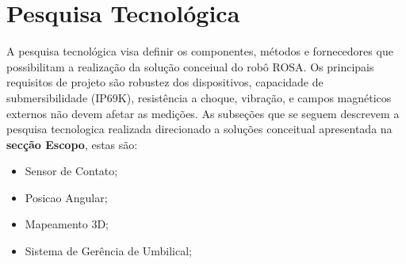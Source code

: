 

\setcounter{secnumdepth}{3}
\section{Pesquisa Tecnológica}
\label{pesqtec}


A pesquisa tecnológica visa definir os componentes, métodos e fornecedores que possibilitam a realização da solução conceiual do robô ROSA. Os principais requisitos de projeto são robustez dos dispositivos, capacidade de submersibilidade (IP69K), resistência a choque, vibração, e campos magnéticos
externos não devem afetar as medições. As subseções que se seguem descrevem a pesquisa tecnologica realizada direcionado a soluções conceitual apresentada na {\bf secção Escopo}, estas são: 

\begin{itemize}

	\item Sensor de Contato; 
	\item Posicao Angular; 
	\item Mapeamento 3D; 
	\item Sistema de Gerência de Umbilical;

\end{itemize}


